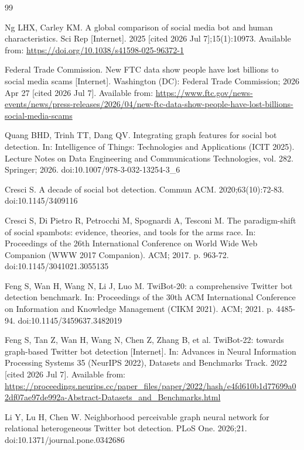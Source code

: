 \documentclass[fonts]{icst}
\begin{document}
\begin{thebibliography}{99}

Ng LHX, Carley KM. A global comparison of social media bot and human characteristics. Sci Rep [Internet]. 2025 [cited 2026 Jul 7];15(1):10973. Available from: \url{https://doi.org/10.1038/s41598-025-96372-1}

Federal Trade Commission. New FTC data show people have lost billions to social media scams [Internet]. Washington (DC): Federal Trade Commission; 2026 Apr 27 [cited 2026 Jul 7]. Available from: \url{https://www.ftc.gov/news-events/news/press-releases/2026/04/new-ftc-data-show-people-have-lost-billions-social-media-scams}

Quang BHD, Trinh TT, Dang QV. Integrating graph features for social bot detection. In: Intelligence of Things: Technologies and Applications (ICIT 2025). Lecture Notes on Data Engineering and Communications Technologies, vol. 282. Springer; 2026. doi:10.1007/978-3-032-13254-3\_6

Cresci S. A decade of social bot detection. Commun ACM. 2020;63(10):72-83. doi:10.1145/3409116

Cresci S, Di Pietro R, Petrocchi M, Spognardi A, Tesconi M. The paradigm-shift of social spambots: evidence, theories, and tools for the arms race. In: Proceedings of the 26th International Conference on World Wide Web Companion (WWW 2017 Companion). ACM; 2017. p. 963-72. doi:10.1145/3041021.3055135

Feng S, Wan H, Wang N, Li J, Luo M. TwiBot-20: a comprehensive Twitter bot detection benchmark. In: Proceedings of the 30th ACM International Conference on Information and Knowledge Management (CIKM 2021). ACM; 2021. p. 4485-94. doi:10.1145/3459637.3482019

Feng S, Tan Z, Wan H, Wang N, Chen Z, Zhang B, et al. TwiBot-22: towards graph-based Twitter bot detection [Internet]. In: Advances in Neural Information Processing Systems 35 (NeurIPS 2022), Datasets and Benchmarks Track. 2022 [cited 2026 Jul 7]. Available from: \url{https://proceedings.neurips.cc/paper_files/paper/2022/hash/e4fd610b1d77699a02df07ae97de992a-Abstract-Datasets_and_Benchmarks.html}

Li Y, Lu H, Chen W. Neighborhood perceivable graph neural network for relational heterogeneous Twitter bot detection. PLoS One. 2026;21. doi:10.1371/journal.pone.0342686


\end{thebibliography}
\end{document}
